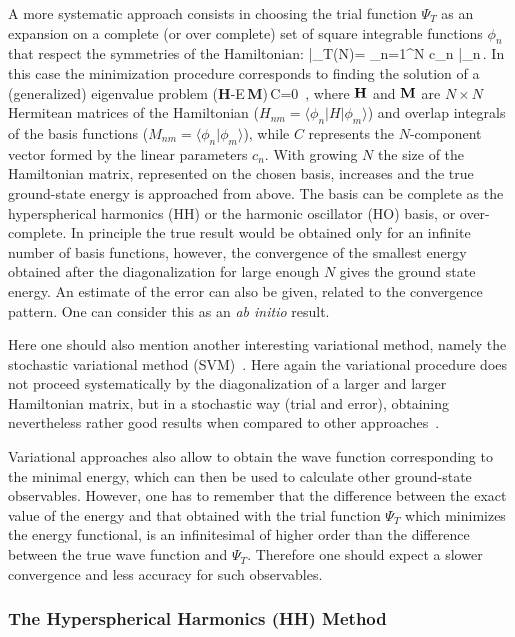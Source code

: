 A more systematic approach consists in choosing the trial function $\Psi_T$ 
as an expansion on a complete (or over complete) set of square
integrable functions $\phi_n$ that respect the symmetries of the Hamiltonian:
\be
\label{Psi_trial}
|\Psi_T(N)\rangle = \sum_{n=1}^N c_n |\phi_n\rangle\,.
\ee
In this case the minimization procedure 
corresponds to finding the solution of a (generalized) eigenvalue problem 
\be
({\bf H}-E\,{\bf M})\,C=0 \,,\label{secular}
\ee
where $\bf H$ and $\bf M$ are $N \times N$ Hermitean matrices of the Hamiltonian ($H_{nm} = \langle \phi_n|  H |\phi_m\rangle$) 
and overlap integrals of the basis functions ($M_{nm} = \langle \phi_n|\phi_m\rangle$),
while $C$ represents the $N$-component vector formed by the linear parameters $c_n$.
With growing $N$ the size of the Hamiltonian matrix, 
represented on the chosen basis, increases and the true ground-state energy is approached from above. 
The basis can be complete as the hyperspherical harmonics (HH) or the harmonic oscillator (HO) basis,  or over-complete.
In principle the true result would be obtained only for an infinite number of basis functions, however,
the convergence of the smallest energy obtained after the diagonalization for large enough $N$ gives
the ground state energy. An estimate of the error can also be given, related to the convergence pattern.
One can  consider this as an  {\it ab initio} result. 

Here one should also mention another interesting variational method, namely the  stochastic variational method (SVM)~\cite{SVM1,SVM2}. 
Here again  the variational procedure does not proceed systematically 
by the diagonalization of a larger and larger Hamiltonian matrix,  
but in a stochastic way (trial and error), obtaining nevertheless rather good results when compared to other approaches~\cite{bench_2001}.

Variational approaches also allow to obtain the wave function corresponding to the minimal energy,
which can then be used to calculate other ground-state observables. However, one has to remember
that the difference between the exact value of the energy and that obtained with the trial function $\Psi_T$
which minimizes the energy functional, 
is an infinitesimal of higher order than the difference between the true wave function and $\Psi_T$. Therefore one should expect
a slower convergence and less accuracy for such observables.

\subsubsection{The Hyperspherical Harmonics (HH) Method}\label{sec:HH}

